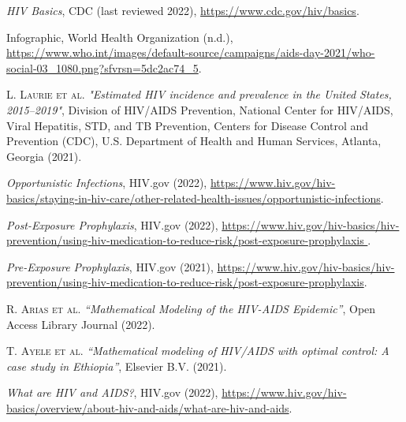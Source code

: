 \documentclass[a4paper, final, 12pt]{article}
\numberwithin{equation}{section}
\begin{document}
\begin{thebibliography}{99}

\textit{HIV Basics}, CDC (last reviewed 2022), \url{https://www.cdc.gov/hiv/basics}.
 
Infographic, World Health Organization (n.d.), \url{https://www.who.int/images/default-source/campaigns/aids-day-2021/who-social-03_1080.png?sfvrsn=5dc2ac74_5}.

\textsc{L. Laurie et al.} \emph{"Estimated HIV incidence and prevalence in the United States, 2015–2019"}, Division of HIV/AIDS Prevention, National Center for HIV/AIDS, Viral Hepatitis, STD, and TB Prevention, Centers for Disease Control and Prevention (CDC), U.S. Department of Health and Human Services, Atlanta, Georgia (2021).

\textit{Opportunistic Infections}, HIV.gov (2022), \url{https://www.hiv.gov/hiv-basics/staying-in-hiv-care/other-related-health-issues/opportunistic-infections}.

\textit{Post-Exposure Prophylaxis}, HIV.gov (2022), \url{https://www.hiv.gov/hiv-basics/hiv-prevention/using-hiv-medication-to-reduce-risk/post-exposure-prophylaxis }.

\textit{Pre-Exposure Prophylaxis}, HIV.gov (2021), \url{https://www.hiv.gov/hiv-basics/hiv-prevention/using-hiv-medication-to-reduce-risk/post-exposure-prophylaxis}.

\textsc{R. Arias et al.} \emph{“Mathematical Modeling of the HIV-AIDS Epidemic”}, Open Access Library Journal (2022).

\textsc{T. Ayele et al.} \emph{“Mathematical modeling of HIV/AIDS with optimal control: A case study in Ethiopia”}, Elsevier B.V. (2021).

\textit{What are HIV and AIDS?}, HIV.gov (2022), \url{https://www.hiv.gov/hiv-basics/overview/about-hiv-and-aids/what-are-hiv-and-aids}.

\end{thebibliography}
\end{document}
